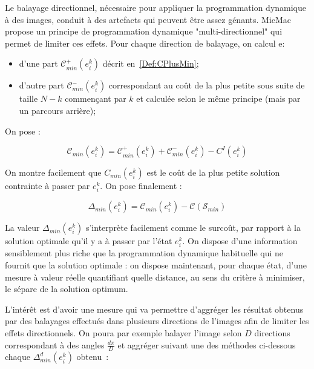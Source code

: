 \label{ProgDyn:MulDir}

Le balayage directionnel, n\'ecessaire pour appliquer la 
programmation dynamique \`a des images, conduit \`a des
artefacts qui peuvent \^etre assez g\'enants.
MicMac propose un principe de programmation dynamique "multi-directionnel"
qui permet de limiter ces effets.
Pour chaque direction de balayage, on
calcul e:

\begin{itemize}
   \item d'une part $ \mathcal C^+_{min} (e^k_i)$ d\'ecrit
    en~\ref{Def:CPlusMin};

   \item d'autre part $ \mathcal C^-_{min} (e^k_i)$ correspondant
   au co\^ut de la plus petite sous suite de
   taille $N-k$  commen\c{c}ant par $k$  et calcul\'ee selon
   le m\^eme principe  (mais par un parcours arri\`ere);
   
\end{itemize}

On pose :

\begin{equation}
  \mathcal C_{min}(e^k_i) = \mathcal C^+_{min} (e^k_i) + \mathcal C^-_{min} (e^k_i) - C^I(e^k_i)
\end{equation}

On montre facilement que $C_{min}(e^k_i)$ est le co\^ut de la plus
petite solution contrainte \`a passer par $e^k_i$.
On pose finalement :

\begin{equation}
    \Delta_{min}(e^k_i) = \mathcal C_{min}(e^k_i) -  \mathcal C ( \mathcal S_{min})
\end{equation}

La valeur $\Delta_{min}(e^k_i)$ s'interpr\`ete facilement comme 
le surco\^ut, par rapport \`a la solution optimale qu'il y a \`a passer
par l'\'etat $e^k_i$. On dispose d'une information sensiblement
plus riche que la programmation dynamique  habituelle qui ne fournit
que la solution optimale : on dispose maintenant, pour chaque \'etat,
d'une mesure \`a valeur r\'eelle quantifiant  quelle distance, au sens 
du crit\`ere \`a minimiser, le s\'epare de la solution optimum.


L'int\'er\^et est d'avoir une mesure qui va permettre d'aggr\'eger les 
r\'esultat obtenus par des balayages effectu\'es dans plusieurs
directions de l'images afin de limiter les effets directionnels.
On poura par exemple balayer l'image selon $D$ directions 
correspondant \`a des angles $\frac{d\pi}{D}$ et aggr\'eger
suivant une des m\'ethodes ci-dessous chaque $\Delta^d_{min}(e^k_i)$ obtenu~:

